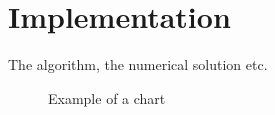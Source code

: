 \section{Implementation} 
\label{implementation}

The algorithm, the numerical solution etc.

\begin{figure}[H]
\begin{center}


\caption{Example of a chart}
\label{fig:chart}
\end{center}
\end{figure} 
